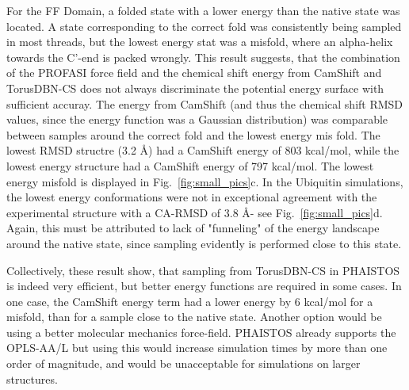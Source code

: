For the FF Domain, a folded state with a lower energy than the native state was located.
A state corresponding to the correct fold was consistently being sampled in most threads, but the lowest energy stat was a misfold, where an alpha-helix towards the C'-end is packed wrongly.
This result suggests, that the combination of the PROFASI force field and the chemical shift energy from CamShift and TorusDBN-CS does not always discriminate the potential energy surface with sufficient accuray. The energy from CamShift (and thus the chemical shift RMSD values, since the energy function was a Gaussian distribution) was comparable between samples around the correct fold and the lowest energy mis fold. The lowest RMSD structre (3.2 \AA) had a CamShift energy of 803 kcal/mol, while the lowest energy structure had a CamShift energy of 797 kcal/mol.
The lowest energy misfold is displayed in Fig.~\ref{fig:small_pics}c.
In the Ubiquitin simulations, the lowest energy conformations were not in exceptional agreement with the experimental structure with a CA-RMSD of 3.8 \AA - see Fig.~\ref{fig:small_pics}d.
 Again, this must be attributed to lack of "funneling" of the energy landscape around the native state, since sampling evidently is performed close to this state.

Collectively, these result show, that sampling from TorusDBN-CS in PHAISTOS is indeed very efficient, but better energy functions are required in some cases. In one case, the CamShift energy term had a lower energy by 6 kcal/mol for a misfold, than for a sample close to the native state.
Another option would be using a better molecular mechanics force-field. PHAISTOS already supports the OPLS-AA/L but using this would increase simulation times by more than one order of magnitude, and would be unacceptable for simulations on larger structures.

